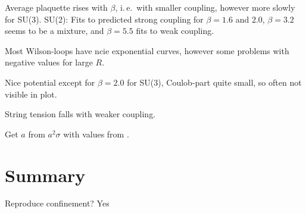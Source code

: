 \documentclass[%
 reprint,
 amsmath,amssymb,
 aps,
]{revtex4-1}
\begin{document}

Average plaquette rises with $\beta$, i.\,e.\, with smaller coupling, however more slowly for SU(3). SU(2): Fits to predicted strong coupling for $\beta=1.6$ and $2.0$, $\beta=3.2$ seems to be a mixture, and $\beta=5.5$ fits to weak coupling.

Most Wilson-loops have ncie exponential curves, however some problems with negative values for large $R$. 

Nice potential except for $\beta=2.0$ for SU(3), Coulob-part quite small, so often not visible in plot.

String tension falls with weaker coupling.

Get $a$ from $a^2\sigma$ with values from \cite{Cardoso_2011}.
%
%

\section{Summary}

Reproduce confinement? Yes


\end{document}
